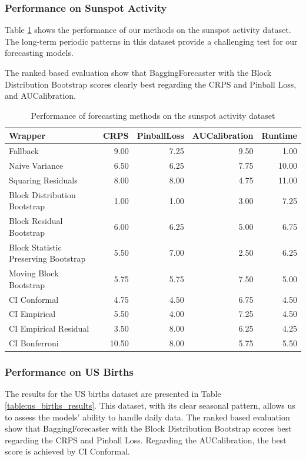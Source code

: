 \subsubsection{Performance on Sunspot Activity}
Table \ref{table:sunspot_results} shows the performance of our methods on the sunspot activity dataset. The long-term periodic patterns in this dataset provide a challenging test for our forecasting models.

The ranked based evaluation show that BaggingForecaster with the Block Distribution Bootstrap scores clearly best regarding the CRPS and Pinball Loss, and AUCalibration.
\begin{table}[h]
    \centering
    \caption{Performance of forecasting methods on the sunspot activity dataset}
    \label{table:sunspot_results}
\begin{tabular}{lrrrr}
\toprule
Wrapper & CRPS & PinballLoss & AUCalibration & Runtime \\
\midrule
Fallback & 9.00 & 7.25 & 9.50 & 1.00 \\
Naive Variance & 6.50 & 6.25 & 7.75 & 10.00 \\
Squaring Residuals & 8.00 & 8.00 & 4.75 & 11.00 \\
Block Distribution Bootstrap & 1.00 & 1.00 & 3.00 & 7.25 \\
Block Residual Bootstrap & 6.00 & 6.25 & 5.00 & 6.75 \\
Block Statistic Preserving Bootstrap & 5.50 & 7.00 & 2.50 & 6.25 \\
Moving Block Bootstrap & 5.75 & 5.75 & 7.50 & 5.00 \\
CI Conformal & 4.75 & 4.50 & 6.75 & 4.50 \\
CI Empirical & 5.50 & 4.00 & 7.25 & 4.50 \\
CI Empirical Residual & 3.50 & 8.00 & 6.25 & 4.25 \\
CI Bonferroni  & 10.50 & 8.00 & 5.75 & 5.50 \\
\bottomrule
\end{tabular}


\end{table}

\subsubsection{Performance on US Births}
The results for the US births dataset are presented in Table \ref{table:us_births_results}. This dataset, with its clear seasonal pattern, allows us to assess the models' ability to handle daily data.
The ranked based evaluation show that BaggingForecaster with the Block Distribution Bootstrap scores best regarding the CRPS and Pinball Loss. 
Regarding the AUCalibration, the best score is achieved by CI Conformal.

